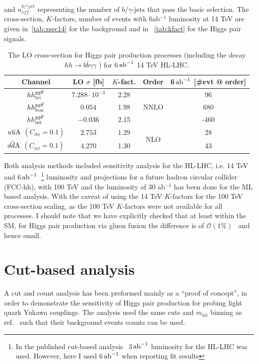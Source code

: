 and $n_{eff}^{b/\gamma jet}$ representing the number of $b/\gamma$-jets that pass the basic selection. The cross-section, $K$-factors, number of events with 6ab$^{-1}$ luminosity at 14 TeV are given in~\autoref{tab:xsec14} for the background and in~ \autoref{tab:kfact} for the Higgs pair signals. 
\begin{table}[t]
	\centering
	\begin{tabular}{ccccc}
		\toprule
		Channel	        &LO $\sigma $ [fb]	&$K$-fact.	&Order&6$\,{\rm ab}^{-1}$ [\#evt @ order]   \\
		\midrule
		$hh^{gg\rm F}_{\rm tri}$	        &  $7.288 \cdot10^{-3}$    & 2.28 &\multirow{3}{*}{NNLO}   &  96   \\ 
		$hh^{gg\rm F}_{\rm box}$            & $0.054$    & 1.98 &  & 680   \\ 
		$hh^{gg\rm F}_{\rm int}$            &$-0.036$    & 2.15 &  &-460   \\ 
		$u\overline u \rm A$ $(C_{d\phi}=0.1)$ &  $2.753$    & 1.29&\multirow{2}{*}{NLO} &  28   \\ 
		$d\overline d \rm A$ $(C_{u\phi}=0.1)$ &  $4.270$    & 1.30 & &  43   \\ 
		\bottomrule
	\end{tabular}
	\caption{  The LO cross-section for Higgs pair production processes (including the decay $hh \to b \bar b \gamma \gamma$ ) for 6$\,{\rm ab}^{-1}$ 14 TeV HL-LHC.}
	\label{tab:kfact}
\end{table}
Both analysis methods included sensitivity analysis for the HL-LHC, i.e. 14 TeV and 6$\,{\rm ab}^{-1}$~\footnote{In the published cut-based analysis~\cite{Alasfar:2019pmn} 3$\,{\rm ab}^{-1}$ luminosity for the HL-LHC was used. However, here I used 6$\,{\rm ab}^{-1}$ when reporting fit results} luminosity and projections for a future hadron circular collider (FCC-hh), with 100 TeV and the luminosity of 30 ab$^{-1}$ has been done for the ML based analysis. With the caveat of using the 14 TeV $K$-factors for the 100 TeV cross-section scaling, as the 100 TeV $K$-factors were not available for all processes. I should note that we have explicitly checked that at least within the SM, for Higgs pair production via gluon fusion the difference is of $\mathcal{O}(1\%)$~\cite{Maltoni:2014eza} and hence small.

\section{Cut-based analysis \label{sec:cutbasedly}}
A cut and count analysis has been preformed mainly as a ``proof of concept'', in order to demonstrate the sensitivity of Higgs pair production for probing light quark Yukawa couplings.  The analysis used the same cuts and $m_{hh}$ binning as ref.~\cite{Azatov:2015oxa} such that their background events counts can be used. 
